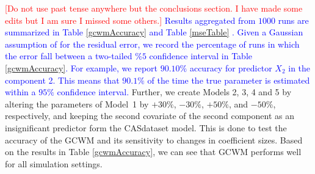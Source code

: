 \documentclass[11pt,letterpaper]{article}
\numberwithin{equation}{section}
\numberwithin{equation}{section}
\numberwithin{equation}{section}
\begin{document}
\textcolor{red}{[Do not use past tense anywhere but the conclusions section. I have made some edits but I am sure I missed some others.]} 
\textcolor{blue}{Results aggregated from $1000$ runs are summarized in Table \ref{gcwmAccuracy} and Table \ref{mseTable} . Given a Gaussian assumption of for the residual error, we record the percentage of runs in which the error fall between a two-tailed $\% 5$ confidence interval in Table \ref{gcwmAccuracy}. For example, we report $90.10\%$ accuracy for predictor $X_2$ in the component 2. This means that $90.1\%$ of the time the true parameter is estimated within a $95\%$ confidence interval. }
Further, we create Models 2, 3, 4 and 5 by altering the parameters of Model~1 by $+30\%$, $-30\%$, $+50\%$, and $-50\%$, respectively, and keeping the second covariate of the second component as an insignificant predictor form the CASdataset model. This is done to test the accuracy of the GCWM and its sensitivity to changes in coefficient sizes. Based on the results in Table \ref{gcwmAccuracy}, we can see that GCWM performs well for all simulation settings.
\end{document}
